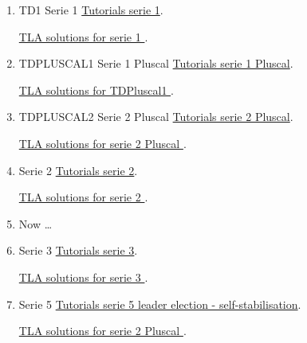 \documentclass[ 12pt]{article}
\begin{document}
\begin{enumerate}



  \item[*] TD1   Serie  1
    \href{http://mery54.github.io/teaching/aspd/lecturesnotes/aspd-app-td1.pdf}{Tutorials 
      serie 1}.

        \href{http://mery54.github.io/teaching/aspd/models/tlatd1.zip}{TLA 
           solutions for serie 1
         }.

\item[*] TDPLUSCAL1   Serie 1  Pluscal 
    \href{http://mery54.github.io/teaching/aspd/lecturesnotes/aspd-app-pluscal1.pdf}{Tutorials 
      serie 1  Pluscal}.

        \href{http://mery54.github.io/teaching/aspd/models/tdpluscal.zip}{TLA 
           solutions for  TDPluscal1
         }.
         

  \item TDPLUSCAL2   Serie 2  Pluscal 
    \href{http://mery54.github.io/teaching/aspd/lecturesnotes/aspd-app-pluscal2.pdf}{Tutorials 
      serie 2  Pluscal}.

        \href{http://mery54.github.io/teaching/aspd/models/tdpluscal.zip}{TLA 
           solutions for serie 2 Pluscal
         }.
         

         
         
\item[TD2]   Serie  2
    \href{http://mery54.github.io/teaching/aspd/lecturesnotes/aspd-app-td2.pdf}{Tutorials 
      serie 2}.

        \href{http://mery54.github.io/teaching/aspd/models/tlatd2.zip}{TLA 
           solutions for serie 2
         }.

       \item[$\star$] Now \ldots
         
         
\item[TD3]   Serie  3
    \href{http://mery54.github.io/teaching/aspd/lecturesnotes/aspd-app-td3.pdf}{Tutorials 
      serie 3}.

        \href{http://mery54.github.io/teaching/aspd/models/tlatd3.zip}{TLA 
           solutions for serie 3
         }.

\item[TD4]   Serie 5 
    \href{http://mery54.github.io/teaching/aspd/lecturesnotes/aspd-app-td5.pdf}{Tutorials
      serie 5   leader election - self-stabilisation}.

        \href{http://mery54.github.io/teaching/aspd/models/tdpluscal2.zip}{TLA 
           solutions for serie 2 Pluscal
         }.
                  
         \end{enumerate}
\end{document}
